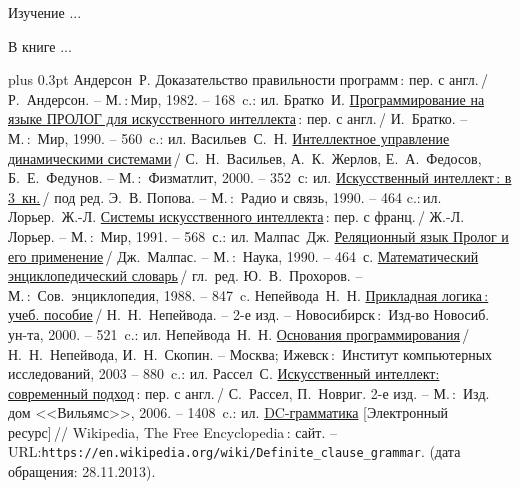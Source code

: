 \documentclass[14pt, a4paper, openany, twoside, final]{extbook} %
\def\emphbib#1{#1}
\begin{document}
Изучение ...

В книге ...


\begin{thebibliography}{99}\itemsep1pt \parskip 0pt plus 0.3pt
 Андерсон~Р. \emphbib{Доказательство правильности программ}\,{}: пер. с англ.\,{}/ Р.~Андерсон. -- М.\,:\,Мир, 1982. -- 168~c.: ил.
 Братко~И. \emphbib{\href{http://royallib.ru/book/bratko_ivan/programmirovanie_na_yazike_prolog_dlya_iskusstvennogo_intellekta.html}{Программирование на языке ПРОЛОГ для искусственного интеллекта}}\,{}: пер. с англ.\,/ И.~Братко. -- М.\,:~Мир, 1990. -- 560~c.: ил.
 Васильев~С.~Н. \emphbib{\href{http://bookfi.org/book/616050}{Интеллектное управление динамическими системами}}\,{}/ С.~Н.~Васильев, А.~К.~Жерлов, Е.~А.~Федосов, Б.~Е.~Федунов. -- М.\,:~Физматлит, 2000. -- 352~с: ил.
 \emphbib{\href{http://aihandbook.intsys.org.ru/index.php/intro/ai-handbook}{Искусственный интеллект\,{}: в 3~кн.}}\,{}/ под ред. Э.~В. Попова. -- М.\,:~Радио и связь, 1990. -- 464 c.:\,{}ил.
 Лорьер.~Ж.-Л.  \emphbib{\href{http://publ.lib.ru/ARCHIVES/L/LOR'ER_Jan_Lui/_Lor'er_J.L..html}{Системы искусственного интеллекта}\,{}: пер. с франц.}\,{}/ Ж.-Л. Лорьер. -- М.\,:~Мир, 1991. -- 568~с.: ил.
 Малпас~Дж. \emphbib{\href{http://padaread.com/?book=40731&pg=1}{Реляционный язык Пролог и его применение}}\,{}/ Дж.~Малпас. -- М.\,:~Наука, 1990. -- 464~с.
 \emphbib{\href{https://app.box.com/shared/793ukgvblxmj0hh6btw4}{Математический энциклопедический словарь}}\,{}/ гл.~ред. Ю.~В.~Прохоров. -- М.\,:~Сов.~энциклопедия, 1988. -- 847~c.
 Непейвода~Н.~Н. \emphbib{\href{http://www.logic-books.info/taxonomy/term/215}{Прикладная логика\,{}: учеб. пособие}}\,{}/ Н.~Н.~Непейвода. -- 2-е изд. -- Новосибирск\,{}:~Изд-во Новосиб. ун-та, 2000. -- 521~c.: ил.
 Непейвода~Н.~Н.  \emphbib{\href{http://philosophy.ru/library/logic_math/library/nepeivoda_prog.pdf}{Основания программирования}}\,{}/ Н.~Н.~Непейвода, И.~Н.~Скопин. -- Москва; Ижевск\,{}:~Институт компьютерных исследований, 2003 -- 880~c.: ил.
 Рассел~С. \href{http://www.aiportal.ru/downloads/books/ai-modern-approach-2-edition-by-rassel-norvig.html}{Искусственный интеллект: современный подход}\,{}: пер. с англ.\,{}/ С.~Рассел, П.~Новриг. 2-е изд. -- М.\,:~Изд. дом <<Вильямс>>, 2006. -- 1408~c.: ил.
 \emphbib{\href{https://en.wikipedia.org/wiki/Definite_clause_grammar}{DC-грамматика}} [Электронный ресурс]\,{}// Wikipedia, The Free Encyclopedia\,{}: сайт. -- URL:\texttt{https://en.wikipedia.org/wiki/Definite\_clause\linebreak\_grammar}. (дата обращения: 28.11.2013).

\end{thebibliography}
\end{document}

